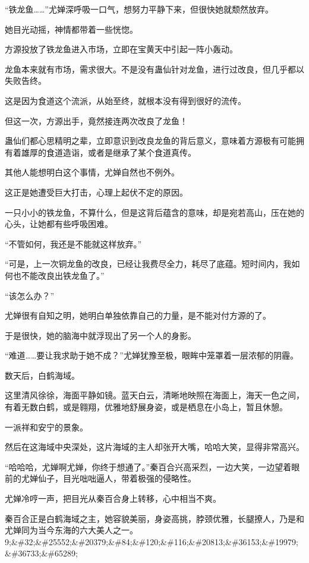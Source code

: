 
\begin{this_body}

“铁龙鱼……”尤婵深呼吸一口气，想努力平静下来，但很快她就颓然放弃。

她目光动摇，神情都带着一些恍惚。

方源投放了铁龙鱼进入市场，立即在宝黄天中引起一阵小轰动。

龙鱼本来就有市场，需求很大。不是没有蛊仙针对龙鱼，进行过改良，但几乎都以失败告终。

这是因为食道这个流派，从始至终，就根本没有得到很好的流传。

但这一次，方源出手，竟然接连两次改良了龙鱼！

蛊仙们都心思精明之辈，立即意识到改良龙鱼的背后意义，意味着方源极有可能拥有着雄厚的食道造诣，或者是继承了某个食道真传。

其他人能想明白这个事情，尤婵自然也不例外。

这正是她遭受巨大打击，心理上起伏不定的原因。

一只小小的铁龙鱼，不算什么，但是这背后蕴含的意味，却是宛若高山，压在她的心头，让她都有些呼吸困难。

“不管如何，我还是不能就这样放弃。”

“可是，上一次铜龙鱼的改良，已经让我费尽全力，耗尽了底蕴。短时间内，我如何也不能改良出铁龙鱼了。”

“该怎么办？”

尤婵很有自知之明，她明白单独依靠自己的力量，是不能对付方源的了。

于是很快，她的脑海中就浮现出了另一个人的身影。

“难道……要让我求助于她不成？”尤婵犹豫至极，眼眸中笼罩着一层浓郁的阴霾。

数天后，白鹤海域。

这里清风徐徐，海面平静如镜。蓝天白云，清晰地映照在海面上，海天一色之间，有着无数白鹤，或是翱翔，优雅地舒展身姿，或是栖息在小岛上，暂且休憩。

一派祥和安宁的景象。

然后在这海域中央深处，这片海域的主人却张开大嘴，哈哈大笑，显得非常高兴。

“哈哈哈，尤婵啊尤婵，你终于想通了。”秦百合兴高采烈，一边大笑，一边望着眼前的尤婵仙子，目光咄咄逼人，带着极强的侵略性。

尤婵冷哼一声，把目光从秦百合身上转移，心中相当不爽。

秦百合正是白鹤海域之主，她容貌美丽，身姿高挑，脖颈优雅，长腿撩人，乃是和尤婵同为当今东海的六大美人之一。9;\&\#32;\&\#25552;\&\#20379;\&\#84;\&\#120;\&\#116;\&\#20813;\&\#36153;\&\#19979;\&\#36733;\&\#65289;


\end{this_body}
